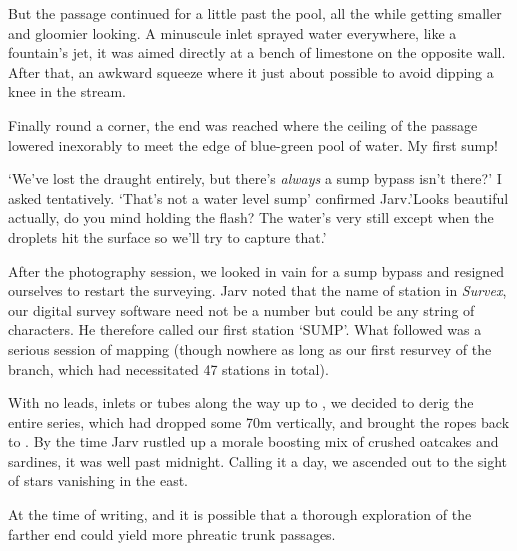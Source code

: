 But the passage continued for a little past the pool, all the while getting smaller and gloomier looking. A minuscule inlet sprayed water everywhere, like a fountain’s jet, it was aimed directly at a bench of limestone on the opposite wall. After that, an awkward squeeze where it just about possible to avoid dipping a knee in the stream. 

Finally round a corner, the end was reached where the ceiling of the passage lowered inexorably to meet the edge of blue-green pool of water. My first sump!

‘We’ve lost the draught entirely, but there’s \emph{always} a sump bypass isn’t there?’ I asked tentatively.
‘That’s not a water level sump’ confirmed Jarv.’Looks beautiful actually, do you mind holding the flash? The water’s very still except when the droplets hit the surface so we’ll try to capture that.’

After the photography session, we looked in vain for a sump bypass and resigned ourselves to restart the surveying. Jarv noted that the name of station in \emph{Survex}, our digital survey software need not be a number but could be any string of characters. He therefore called our first station ‘SUMP’. What followed was a serious session of mapping (though nowhere as long as our first resurvey of the  branch, which had necessitated 47 stations in total). 

With no leads, inlets or tubes along the way up to , we decided to derig the entire series, which had dropped some 70m vertically, and brought the ropes back to . By the time Jarv rustled up a morale boosting mix of crushed oatcakes and sardines, it was well past midnight. Calling it a day, we ascended out to the sight of stars vanishing in the east. 

At the time of writing,  and it is possible that a thorough exploration of the farther end could yield more phreatic trunk passages.

